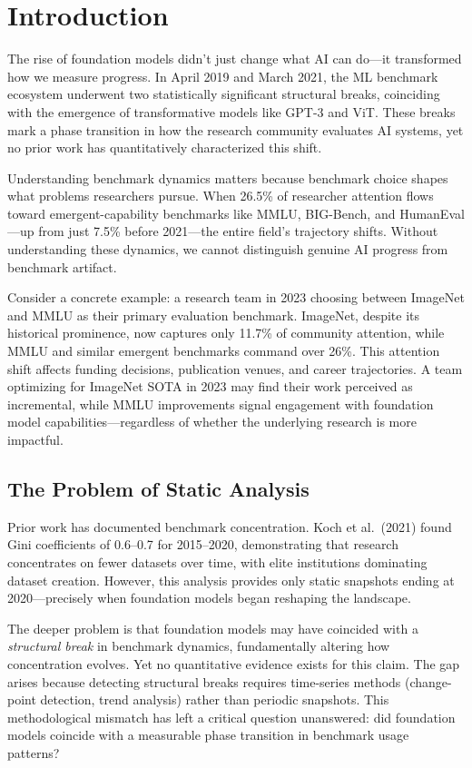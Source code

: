 \section{Introduction}
\label{sec:introduction}

The rise of foundation models didn't just change what AI can do---it transformed how we measure progress. In April 2019 and March 2021, the ML benchmark ecosystem underwent two statistically significant structural breaks, coinciding with the emergence of transformative models like GPT-3 and ViT. These breaks mark a phase transition in how the research community evaluates AI systems, yet no prior work has quantitatively characterized this shift.

Understanding benchmark dynamics matters because benchmark choice shapes what problems researchers pursue. When 26.5\% of researcher attention flows toward emergent-capability benchmarks like MMLU, BIG-Bench, and HumanEval---up from just 7.5\% before 2021---the entire field's trajectory shifts. Without understanding these dynamics, we cannot distinguish genuine AI progress from benchmark artifact.

Consider a concrete example: a research team in 2023 choosing between ImageNet and MMLU as their primary evaluation benchmark. ImageNet, despite its historical prominence, now captures only 11.7\% of community attention, while MMLU and similar emergent benchmarks command over 26\%. This attention shift affects funding decisions, publication venues, and career trajectories. A team optimizing for ImageNet SOTA in 2023 may find their work perceived as incremental, while MMLU improvements signal engagement with foundation model capabilities---regardless of whether the underlying research is more impactful.

\subsection{The Problem of Static Analysis}

Prior work has documented benchmark concentration. Koch et al.\ (2021) found Gini coefficients of 0.6--0.7 for 2015--2020, demonstrating that research concentrates on fewer datasets over time, with elite institutions dominating dataset creation. However, this analysis provides only static snapshots ending at 2020---precisely when foundation models began reshaping the landscape.

The deeper problem is that foundation models may have coincided with a \emph{structural break} in benchmark dynamics, fundamentally altering how concentration evolves. Yet no quantitative evidence exists for this claim. The gap arises because detecting structural breaks requires time-series methods (change-point detection, trend analysis) rather than periodic snapshots. This methodological mismatch has left a critical question unanswered: did foundation models coincide with a measurable phase transition in benchmark usage patterns?

